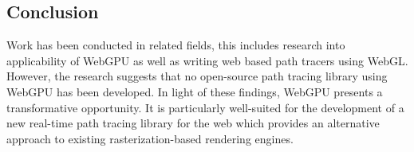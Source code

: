 \subsection*{Conclusion}

Work has been conducted in related fields, this includes research into applicability of WebGPU as well as writing web based path tracers using \gls{WebGL}. However, the research suggests that no open-source path tracing library using WebGPU has been developed. In light of these findings, WebGPU presents a transformative opportunity. It is particularly well-suited for the development of a new real-time path tracing library for the web which provides an alternative approach to existing rasterization-based rendering engines.
